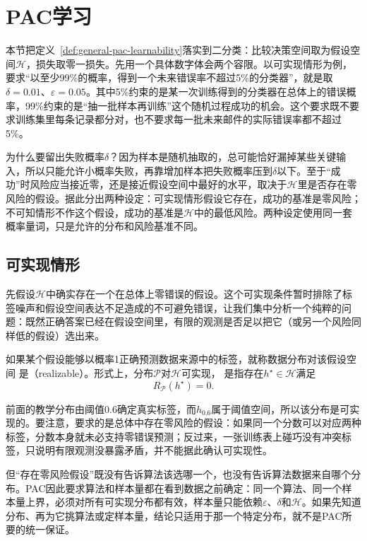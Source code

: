 \section{PAC学习}
\label{sec:pac-learning}

本节把定义~\ref{def:general-pac-learnability}落实到二分类：比较决策空间取为假设空间$\mathcal H$，损失取零一损失。先用一个具体数字体会两个容限。以可实现情形为例，要求“以至少99\%的概率，得到一个未来错误率不超过5\%的分类器”，就是取$\delta=0.01$、$\varepsilon=0.05$。其中5\%约束的是某一次训练得到的分类器在总体上的错误概率，99\%约束的是“抽一批样本再训练”这个随机过程成功的机会。这个要求既不要求训练集里每条记录都分对，也不要求每一批未来邮件的实际错误率都不超过5\%。

为什么要留出失败概率$\delta$？因为样本是随机抽取的，总可能恰好漏掉某些关键输入，所以只能允许小概率失败，再靠增加样本把失败概率压到$\delta$以下。至于“成功”时风险应当接近零，还是接近假设空间中最好的水平，取决于$\mathcal H$里是否存在零风险的假设。据此分出两种设定：可实现情形假设它存在，成功的基准是零风险；不可知情形不作这个假设，成功的基准是$\mathcal H$中的最低风险。两种设定使用同一套概率量词，只是允许的分布和风险基准不同。

\subsection{可实现情形}

先假设$\mathcal H$中确实存在一个在总体上零错误的假设。这个可实现条件暂时排除了标签噪声和假设空间表达不足造成的不可避免错误，让我们集中分析一个纯粹的问题：既然正确答案已经在假设空间里，有限的观测是否足以把它（或另一个风险同样低的假设）选出来。

\begin{definition}[可实现性]
\label{def:realizability}
如果某个假设能够以概率1正确预测数据来源中的标签，就称数据分布对该假设空间
是（realizable）。形式上，分布$\mathcal P$对$\mathcal H$可实现，
是指存在$h^\star\in\mathcal H$满足
\[
 R_{\mathcal P}(h^\star)=0.
\]
\end{definition}

前面的教学分布由阈值0.6确定真实标签，而$h_{0.6}$属于阈值空间，所以该分布是可实现的。要注意，要求的是总体中存在零风险的假设：如果同一个分数可以对应两种标签，分数本身就未必支持零错误预测；反过来，一张训练表上碰巧没有冲突标签，只说明有限观测没暴露矛盾，并不能据此确认可实现性。

但“存在零风险假设”既没有告诉算法该选哪一个，也没有告诉算法数据来自哪个分布。PAC因此要求算法和样本量都在看到数据之前确定：同一个算法、同一个样本量上界，必须对所有可实现分布都有效，样本量只能依赖$\varepsilon$、$\delta$和$\mathcal H$。如果先知道分布、再为它挑算法或定样本量，结论只适用于那一个特定分布，就不是PAC所要的统一保证。

